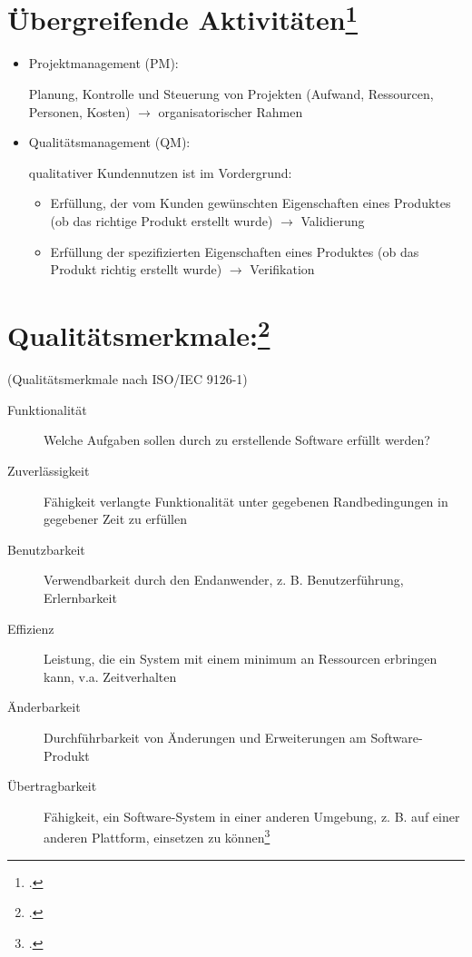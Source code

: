 \documentclass{lehramt-informatik}
\begin{document}
\section{Übergreifende Aktivitäten\footcite[Seite 11]{sosy:fs:1}}

\begin{itemize}
\item Projektmanagement (PM):

Planung, Kontrolle und Steuerung von Projekten (Aufwand, Ressourcen,
Personen, Kosten) $\rightarrow$ organisatorischer Rahmen

\item Qualitätsmanagement (QM):

qualitativer Kundennutzen ist im Vordergrund:

\begin{itemize}
\item Erfüllung, der vom Kunden gewünschten Eigenschaften eines Produktes
(ob das richtige Produkt erstellt wurde) $\rightarrow$ Validierung

\item Erfüllung der spezifizierten Eigenschaften eines Produktes
(ob das Produkt richtig erstellt wurde) $\rightarrow$ Verifikation
\end{itemize}

\end{itemize}

\section{Qualitätsmerkmale:\footcite[Seite 12]{sosy:fs:1}}

(Qualitätsmerkmale nach ISO/IEC 9126-1)

\begin{description}

\item[Funktionalität]
Welche Aufgaben sollen durch zu erstellende Software erfüllt werden?

\item[Zuverlässigkeit]
Fähigkeit verlangte Funktionalität unter gegebenen Randbedingungen in
gegebener Zeit zu erfüllen

\item[Benutzbarkeit]
Verwendbarkeit durch den Endanwender, z. B. Benutzerführung,
Erlernbarkeit

\item[Effizienz]
Leistung, die ein System mit einem minimum an Ressourcen erbringen kann,
v.a. Zeitverhalten

\item[Änderbarkeit]
Durchführbarkeit von Änderungen und Erweiterungen am Software-Produkt

\item[Übertragbarkeit]
Fähigkeit, ein Software-System in einer anderen Umgebung, z. B. auf
einer anderen Plattform, einsetzen zu können\footcite[Seite
15-16]{schatten}
\end{description}
\end{document}
